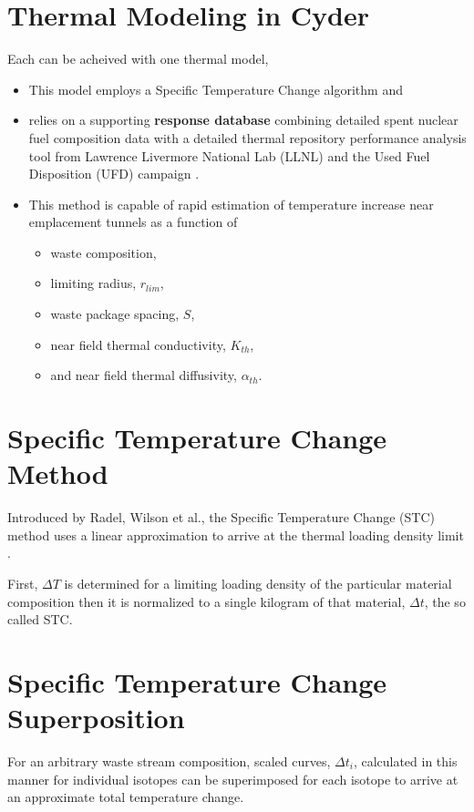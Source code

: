 \documentclass[letterpaper]{article}
\begin{document}
\section{Thermal Modeling in Cyder}
Each can be acheived with one thermal model,
\begin{itemize}
\item This model employs a Specific Temperature Change algorithm \cite{radel_effect_2007, radel_repository_2007} and
\item relies on a supporting \textbf{response database} combining detailed 
spent nuclear fuel composition data \cite{carter_fuel_2011} with a detailed 
thermal repository performance analysis tool from Lawrence Livermore National 
Lab (LLNL) and the Used Fuel Disposition (UFD) 
campaign \cite{greenberg_application_2012}.  
\item This method is capable of rapid estimation of temperature increase near emplacement tunnels as a function of 
\begin{itemize}
\item waste composition,
\item limiting radius, $r_{lim}$, 
\item waste package spacing, $S$, 
\item near field thermal conductivity, $K_{th}$, 
\item and near field thermal diffusivity, $\alpha_{th}$.
\end{itemize}
\end{itemize}

\section{Specific Temperature Change Method}
Introduced by Radel, Wilson et al., the Specific Temperature Change (STC) method uses 
a linear approximation to arrive at the thermal loading density limit 
\cite{radel_repository_2007, radel_effect_2007}.  

First, $\Delta T$ is determined for a limiting loading density 
of the particular material composition then it is normalized to a single 
kilogram of that material, $\Delta t$, the so called STC. 


\section{Specific Temperature Change Superposition}

For an arbitrary waste stream composition, scaled curves, $\Delta t_i$, calculated in this 
manner for individual isotopes can be superimposed for each isotope to arrive at an 
approximate total temperature change.
\end{document}
